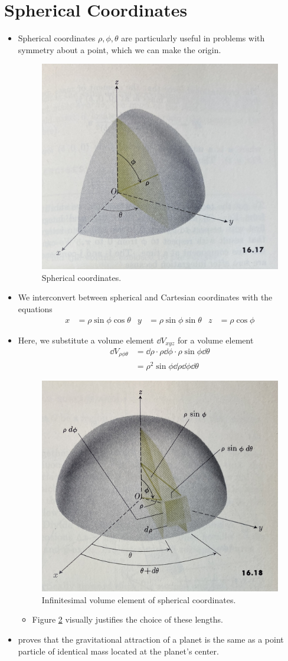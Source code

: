 \documentclass[../main.tex]{subfiles}
\begin{document}
\section{Spherical Coordinates}
\begin{itemize}
    \item Spherical coordinates $\rho,\phi,\theta$ are particularly useful in problems with symmetry about a point, which we can make the origin.
    \begin{figure}[h!]
        \centering
        \includegraphics[width=0.4\linewidth]{ExtFiles/sphericalCoordinates.jpg}
        \caption{Spherical coordinates.}
        \label{fig:sphericalCoordinates}
    \end{figure}
    \item We interconvert between spherical and Cartesian coordinates with the equations
    \begin{align*}
        x &= \rho\sin\phi\cos\theta&
            y &= \rho\sin\phi\sin\theta&
                z &= \rho\cos\phi
    \end{align*}
    \item Here, we substitute a volume element $\dd{V}_{xyz}$ for a volume element
    \begin{align*}
        \dd{V}_{\rho\phi\theta} &= \dd{\rho}\cdot\rho\dd{\phi}\cdot\rho\sin\phi\dd{\theta}\\
        &= \rho^2\sin\phi\dd{\rho}\dd{\phi}\dd{\theta}
    \end{align*}
    \begin{figure}[h!]
        \centering
        \includegraphics[width=0.4\linewidth]{ExtFiles/dVspherical.jpg}
        \caption{Infinitesimal volume element of spherical coordinates.}
        \label{fig:dVspherical}
    \end{figure}
    \begin{itemize}
        \item Figure \ref{fig:dVspherical} visually justifies the choice of these lengths.
    \end{itemize}
    \item \cite{bib:Thomas} proves that the gravitational attraction of a planet is the same as a point particle of identical mass located at the planet's center.
\end{itemize}
\end{document}
